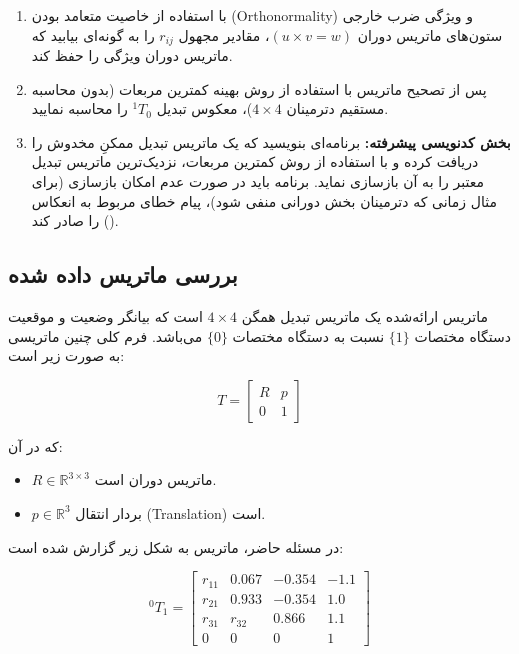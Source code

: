 \documentclass{article}
\begin{document}
\begin{enumerate}
	\item با استفاده از خاصیت متعامد بودن (Orthonormality) و ویژگی ضرب خارجی ستون‌های ماتریس دوران $(u \times v = w)$، مقادیر مجهول $r_{ij}$ را به گونه‌ای بیابید که ماتریس دوران ویژگی  را حفظ کند.
	
	\item پس از تصحیح ماتریس با استفاده از روش بهینه کمترین مربعات (بدون محاسبه مستقیم دترمینان $4\times4$)، معکوس تبدیل $^{1}T_{0}$ را محاسبه نمایید.
	
	\item \textbf{بخش کدنویسی پیشرفته:} برنامه‌ای بنویسید که یک ماتریس تبدیل ممکنِ مخدوش را دریافت کرده و با استفاده از روش کمترین مربعات، نزدیک‌ترین ماتریس تبدیل معتبر را به آن بازسازی نماید. برنامه باید در صورت عدم امکان بازسازی (برای مثال زمانی که دترمینان بخش دورانی منفی شود)، پیام خطای مربوط به انعکاس () را صادر کند.
\end{enumerate}



\subsection{بررسی ماتریس داده شده}

ماتریس ارائه‌شده یک ماتریس تبدیل همگن $4\times4$ است که بیانگر وضعیت و موقعیت دستگاه مختصات $\{1\}$ نسبت به دستگاه مختصات $\{0\}$ می‌باشد. فرم کلی چنین ماتریسی به صورت زیر است:

\[
T=
\begin{bmatrix}
	R & p \\
	0 & 1
\end{bmatrix}
\]

که در آن:
\begin{itemize}
	\item $R \in \mathbb{R}^{3\times3}$ ماتریس دوران است.
	\item $p \in \mathbb{R}^{3}$ بردار انتقال (Translation) است.
\end{itemize}

در مسئله حاضر، ماتریس به شکل زیر گزارش شده است:

\[
^{0}T_{1} =
\begin{bmatrix}
	r_{11} & 0.067 & -0.354 & -1.1 \\
	r_{21} & 0.933 & -0.354 & 1.0 \\
	r_{31} & r_{32} & 0.866 & 1.1 \\
	0 & 0 & 0 & 1
\end{bmatrix}
\]
\end{document}

